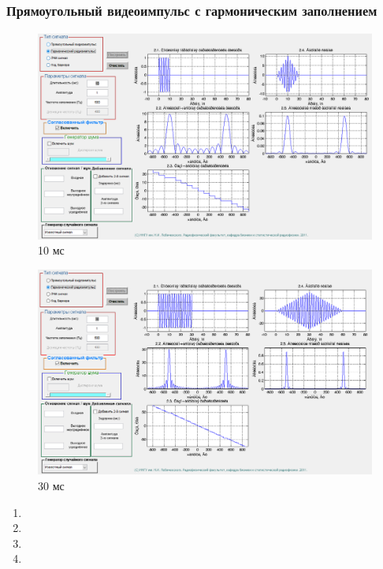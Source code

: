 \subsubsection{Прямоугольный видеоимпульс с гармоническим заполнением}
\begin{figure}[H]
    \centering
    \includegraphics[width=0.9\linewidth]{imgs/task_2/t2s2_10.png}
    \caption{10 мс}
    \label{fig:task_2_2_10}
\end{figure}
\begin{figure}[H]
    \centering
    \includegraphics[width=0.9\linewidth]{imgs/task_2/t2s2_30.png}
    \caption{30 мс}
    \label{fig:task_2_2_30}
\end{figure}

\begin{enumerate}
    \item 
    \item 
    \item 
    \item 
\end{enumerate}


